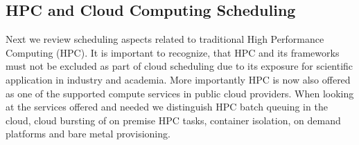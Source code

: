 \documentclass[final,5p,times,twocolumn]{elsarticle}
\begin{document}
\color{black}



\subsection{HPC and Cloud Computing Scheduling}
\label{sec:hpc}


Next we review scheduling aspects related to traditional High
Performance Computing (HPC). It is important to recognize, that HPC
and its frameworks must not be excluded as part of cloud scheduling
due to its exposure for scientific application in industry and
academia. More importantly HPC is now also offered as one of the supported
compute services in public cloud providers. When looking at the services offered
and needed we distinguish HPC batch queuing in the cloud, cloud
bursting of on premise HPC tasks, container isolation, on demand
platforms and bare metal provisioning.
\end{document}
